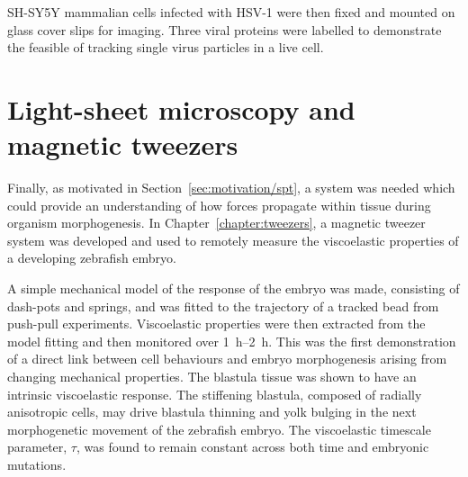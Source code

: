 \gls{SH-SY5Y} mammalian cells infected with \gls{HSV}-1 were then fixed and mounted on glass cover slips for imaging.
Three viral proteins were labelled to demonstrate the feasible of tracking single virus particles in a live cell.

\section{Light-sheet microscopy and magnetic tweezers} %

Finally, as motivated in Section~\ref{sec:motivation/spt}, a system was needed which could provide an understanding of how forces propagate within tissue during organism morphogenesis.
In Chapter~\ref{chapter:tweezers}, a magnetic tweezer system was developed and used to remotely measure the viscoelastic properties of a developing zebrafish embryo.

A simple mechanical model of the response of the embryo was made, consisting of dash-pots and springs, and was fitted to the trajectory of a tracked bead from push-pull experiments.
Viscoelastic properties were then extracted from the model fitting and then monitored over \SIrange{1}{2}{\hour}.
This was the first demonstration of a direct link between cell behaviours and embryo morphogenesis arising from changing mechanical properties.
The blastula tissue was shown to have an intrinsic viscoelastic response.
The stiffening blastula, composed of radially anisotropic cells, may drive blastula thinning and yolk bulging in the next morphogenetic movement of the zebrafish embryo.
The viscoelastic timescale parameter, \(\tau \), was found to remain constant across both time and embryonic mutations.

